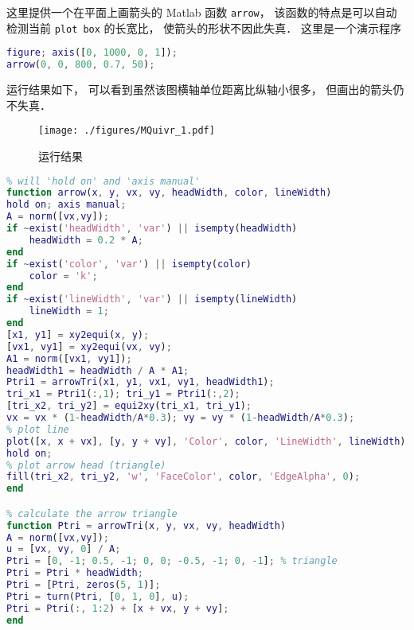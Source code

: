 

这里提供一个在平面上画箭头的 Matlab 函数 \verb|arrow|， 该函数的特点是可以自动检测当前 \verb|plot box| 的长宽比， 使箭头的形状不因此失真． 这里是一个演示程序
\begin{lstlisting}[language=matlab]
figure; axis([0, 1000, 0, 1]);
arrow(0, 0, 800, 0.7, 50);
\end{lstlisting}
运行结果如下， 可以看到虽然该图横轴单位距离比纵轴小很多， 但画出的箭头仍不失真．
\begin{figure}[ht]
\centering
\texttt{[image: ./figures/MQuivr\_1.pdf]}
\caption{运行结果} \label{MQuivr_fig1}
\end{figure}

\begin{lstlisting}[language=matlab, caption=arrow.m]
% plot arrow without distortion by getting current aspect ratio
% will 'hold on' and 'axis manual'
function arrow(x, y, vx, vy, headWidth, color, lineWidth)
hold on; axis manual;
A = norm([vx,vy]);
if ~exist('headWidth', 'var') || isempty(headWidth)
    headWidth = 0.2 * A;
end
if ~exist('color', 'var') || isempty(color)
    color = 'k';
end
if ~exist('lineWidth', 'var') || isempty(lineWidth)
    lineWidth = 1;
end
[x1, y1] = xy2equi(x, y);
[vx1, vy1] = xy2equi(vx, vy);
A1 = norm([vx1, vy1]);
headWidth1 = headWidth / A * A1;
Ptri1 = arrowTri(x1, y1, vx1, vy1, headWidth1);
tri_x1 = Ptri1(:,1); tri_y1 = Ptri1(:,2);
[tri_x2, tri_y2] = equi2xy(tri_x1, tri_y1);
vx = vx * (1-headWidth/A*0.3); vy = vy * (1-headWidth/A*0.3);
% plot line
plot([x, x + vx], [y, y + vy], 'Color', color, 'LineWidth', lineWidth);
hold on;
% plot arrow head (triangle)
fill(tri_x2, tri_y2, 'w', 'FaceColor', color, 'EdgeAlpha', 0);
end

% calculate the arrow triangle
function Ptri = arrowTri(x, y, vx, vy, headWidth)
A = norm([vx,vy]);
u = [vx, vy, 0] / A;
Ptri = [0, -1; 0.5, -1; 0, 0; -0.5, -1; 0, -1]; % triangle
Ptri = Ptri * headWidth;
Ptri = [Ptri, zeros(5, 1)];
Ptri = turn(Ptri, [0, 1, 0], u);
Ptri = Ptri(:, 1:2) + [x + vx, y + vy];
end
\end{lstlisting}
